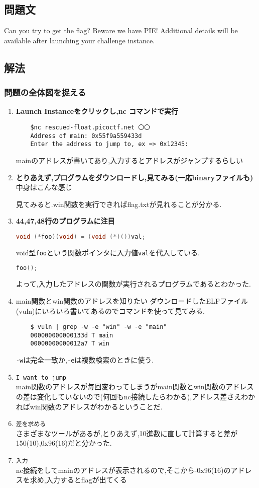 \documentclass{jsarticle}
\begin{document}
\subsection{問題文}
Can you try to get the flag? Beware we have PIE!
Additional details will be available after launching your challenge instance.
\subsection{解法}
\subsubsection{問題の全体図を捉える}
\begin{enumerate}
	\item \textbf{Launch Instanceをクリックし,nc コマンドで実行}
	\begin{verbatim}
	$nc rescued-float.picoctf.net 〇〇 
	Address of main: 0x55f9a559433d
	Enter the address to jump to, ex => 0x12345: 
	\end{verbatim}
	mainのアドレスが書いてあり,入力するとアドレスがジャンプするらしい
	\item \textbf{とりあえず,プログラムをダウンロードし,見てみる(一応binaryファイルも)}
	中身はこんな感じ
	
	見てみると.win関数を実行できればflag.txtが見れることが分かる.
	\item \textbf{44,47,48行のプログラムに注目}
	\begin{lstlisting}[language=C]
	void (*foo)(void) = (void (*)())val;
	\end{lstlisting}
	void型\texttt{foo}という関数ポインタに入力値\texttt{val}を代入している.
	\begin{lstlisting}[language=C]
	foo();
	\end{lstlisting}
	よって,入力したアドレスの関数が実行されるプログラムであるとわかった.
	\item main関数とwin関数のアドレスを知りたい
	ダウンロードしたELFファイル(vuln)にいろいろ書いてあるのでコマンドを使って見てみる.
	\begin{verbatim}
	$ vuln | grep -w -e "win" -w -e "main"
	000000000000133d T main
	00000000000012a7 T win
	\end{verbatim}
	\texttt{-w}は完全一致か,\texttt{-e}は複数検索のときに使う.
	\item \texttt{I want to jump}\\	
	main関数のアドレスが毎回変わってしまうがmain関数とwin関数のアドレスの差は変化していないので(何回もnc接続したらわかる),アドレス差さえわかればwin関数のアドレスがわかるということだ.
	\item \texttt{差を求める} \\
	さまざまなツールがあるが,とりあえず,10進数に直して計算すると差が150(10),0x96(16)だと分かった.
	\item \texttt{入力}\\
	nc接続をしてmainのアドレスが表示されるので,そこから-0x96(16)のアドレスを求め,入力するとflagが出てくる
\end{enumerate}
\end{document}
